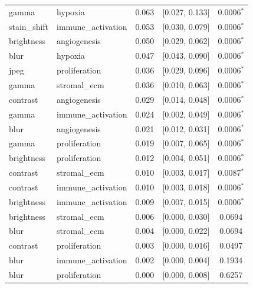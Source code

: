 \begin{table}[t]
\begin{tabular}{llccc}
gamma & hypoxia & 0.063 & [0.027, 0.133] & 0.0006$^{*}$ \\
stain\_shift & immune\_activation & 0.053 & [0.030, 0.079] & 0.0006$^{*}$ \\
brightness & angiogenesis & 0.050 & [0.029, 0.062] & 0.0006$^{*}$ \\
blur & hypoxia & 0.047 & [0.043, 0.090] & 0.0006$^{*}$ \\
jpeg & proliferation & 0.036 & [0.029, 0.096] & 0.0006$^{*}$ \\
gamma & stromal\_ecm & 0.036 & [0.010, 0.063] & 0.0006$^{*}$ \\
contrast & angiogenesis & 0.029 & [0.014, 0.048] & 0.0006$^{*}$ \\
gamma & immune\_activation & 0.024 & [0.002, 0.049] & 0.0006$^{*}$ \\
blur & angiogenesis & 0.021 & [0.012, 0.031] & 0.0006$^{*}$ \\
gamma & proliferation & 0.019 & [0.007, 0.065] & 0.0006$^{*}$ \\
brightness & proliferation & 0.012 & [0.004, 0.051] & 0.0006$^{*}$ \\
contrast & stromal\_ecm & 0.010 & [0.003, 0.017] & 0.0087$^{*}$ \\
contrast & immune\_activation & 0.010 & [0.003, 0.018] & 0.0006$^{*}$ \\
brightness & immune\_activation & 0.009 & [0.007, 0.015] & 0.0006$^{*}$ \\
brightness & stromal\_ecm & 0.006 & [0.000, 0.030] & 0.0694 \\
blur & stromal\_ecm & 0.004 & [0.000, 0.022] & 0.0694 \\
contrast & proliferation & 0.003 & [0.000, 0.016] & 0.0497 \\
blur & immune\_activation & 0.002 & [0.000, 0.004] & 0.1934 \\
blur & proliferation & 0.000 & [0.000, 0.008] & 0.6257 \\
\bottomrule
\end{tabular}
\end{table}
